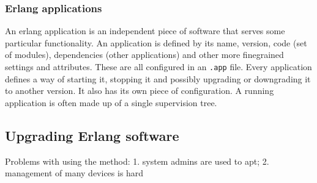 \subsubsection{Erlang applications}

An erlang application is an independent piece of software that serves some particular
functionality. An application is defined by its name, version, code (set of modules),
dependencies (other applications) and other more finegrained settings and attributes. These are all
configured in an {\tt .app} file. Every application defines a way of starting it, stopping it and possibly
upgrading or downgrading it to another version. It also has its own piece of configuration.
A running application is often made up of a single supervision tree.

\subsection{Upgrading Erlang software}

Problems with using the method: 1. system admins are used to apt; 2. management of many devices is hard
